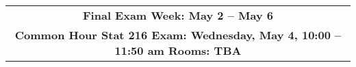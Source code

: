 \begin{center}
\begin{tabular}{|c|c|c|}
  \multicolumn{3}{|c|}{\textbf{Final Exam Week: May 2 -- May 6 }} \\
  \multicolumn{3}{|c|}{\bf{ Common Hour Stat 216  Exam: 
      Wednesday, May 4, 10:00 -- 11:50 am Rooms: TBA}} \\
\hline

\end{tabular}
\vspace{.2in} \\
\end{center}


